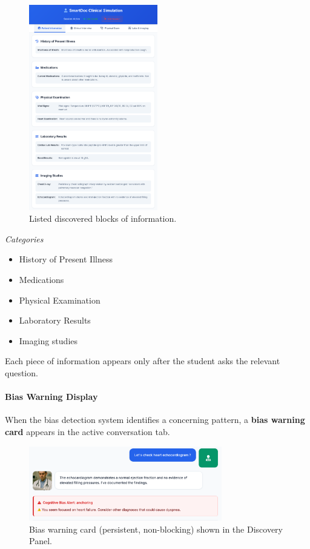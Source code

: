 \begin{figure}[h]
  \centering
  \includegraphics[width=0.5\textwidth]{figures/ui/ui_tabs_anamnesis_exam_results.png}
  \caption{Listed discovered blocks of information.}
  \label{fig:ui-tabs}
\end{figure}

\textit{Categories}
\begin{itemize}
  \item History of Present Illness
  \item Medications
  \item Physical Examination
  \item Laboratory Results
  \item Imaging studies
\end{itemize}
Each piece of information appears only after the student asks the relevant question.


\paragraph{Bias Warning Display}

When the bias detection system identifies a concerning pattern, a \textbf{bias warning card} appears in the active conversation tab.

\begin{figure}[h]
  \centering
  \includegraphics[width=0.75\textwidth]{figures/ui/ui_bias_card.png}
  \caption{Bias warning card (persistent, non-blocking) shown in the Discovery Panel.}
  \label{fig:ui-bias-card}
\end{figure}

